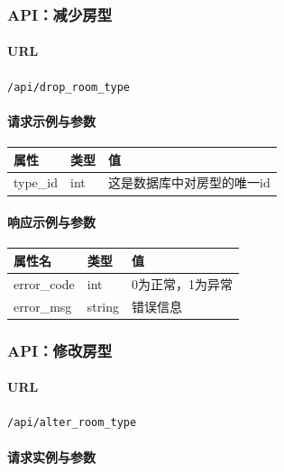 \documentclass[]{article}
\let\oldparagraph\paragraph
\renewcommand{\paragraph}[1]{\oldparagraph{#1}\mbox{}}
\begin{document}
\hypertarget{apiux51cfux5c11ux623fux578b}{%
\subsubsection{API：减少房型}\label{apiux51cfux5c11ux623fux578b}}

\hypertarget{url-17}{%
\paragraph{URL}\label{url-17}}

\texttt{/api/drop\_room\_type}

\hypertarget{ux8bf7ux6c42ux793aux4f8bux4e0eux53c2ux6570-3}{%
\paragraph{请求示例与参数}\label{ux8bf7ux6c42ux793aux4f8bux4e0eux53c2ux6570-3}}

\begin{longtable}[]{@{}lll@{}}
\toprule
属性 & 类型 & 值\tabularnewline
\midrule
\endhead
type\_id & int & 这是数据库中对房型的唯一id\tabularnewline
\bottomrule
\end{longtable}

\hypertarget{ux54cdux5e94ux793aux4f8bux4e0eux53c2ux6570-9}{%
\paragraph{响应示例与参数}\label{ux54cdux5e94ux793aux4f8bux4e0eux53c2ux6570-9}}

\begin{longtable}[]{@{}lll@{}}
\toprule
属性名 & 类型 & 值\tabularnewline
\midrule
\endhead
error\_code & int & 0为正常，1为异常\tabularnewline
error\_msg & string & 错误信息\tabularnewline
\bottomrule
\end{longtable}

\hypertarget{apiux4feeux6539ux623fux578b}{%
\subsubsection{API：修改房型}\label{apiux4feeux6539ux623fux578b}}

\hypertarget{url-18}{%
\paragraph{URL}\label{url-18}}

\texttt{/api/alter\_room\_type}

\hypertarget{ux8bf7ux6c42ux5b9eux4f8bux4e0eux53c2ux6570-1}{%
\paragraph{请求实例与参数}\label{ux8bf7ux6c42ux5b9eux4f8bux4e0eux53c2ux6570-1}}
\end{document}
